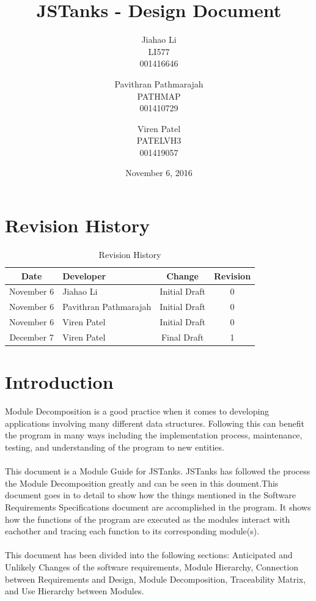 \documentclass{article}
\begin{document}
\newpage
\title{JSTanks - Design Document}
\date{November 6, 2016}
\author{Jiahao Li\\LI577\\001416646\and Pavithran Pathmarajah\\PATHMAP\\
001410729 \and Viren Patel\\PATELVH3\\001419057}

\maketitle

\newpage
{}
\tableofcontents

\newpage
\section{Revision History}
\begin{table}[H]
\caption{Revision History}
	\begin{tabularx}{\textwidth}{cXcc}
		\toprule
		Date & Developer & Change&Revision\\
		\midrule
		November 6&Jiahao Li &Initial Draft&0 \\
		November 6&Pavithran Pathmarajah &Initial Draft&0\\
		November 6&Viren Patel  &Initial Draft&0\\
		December 7&Viren Patel &Final Draft&1\\
	\end{tabularx}
\end{table}

\section{Introduction}
Module Decomposition is a good practice when it comes to developing applications involving many different data structures. Following this can benefit the program in many ways including the implementation process, maintenance, testing, and understanding of the program to new entities.\\ \\
This document is a Module Guide for JSTanks. JSTanks has followed the process the Module Decomposition greatly and can be seen in this doument.This document goes in to detail to show how the things mentioned in the Software Requirements Specifications document are accomplished in the program. It shows how the functions of the program are executed as the modules interact with eachother and tracing each function to its corresponding module(s). \\ \\
This document has been divided into the following sections: Anticipated and Unlikely Changes of the software requirements, Module Hierarchy, Connection between Requirements and Design, Module Decomposition, Traceability Matrix, and Use Hierarchy between Modules.
\end{document}
